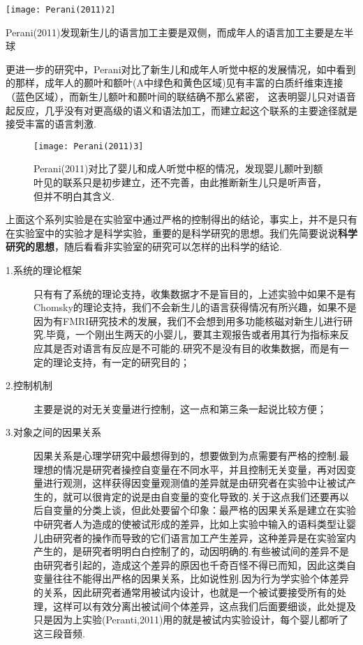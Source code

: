 \begin{marginfigure}
	\texttt{[image: Perani(2011)2]}
	\caption[Perani(2011)2]{Perani(2011)发现新生儿的语言加工主要是双侧，而成年人的语言加工主要是左半球}
\end{marginfigure}

更进一步的研究中，Perani对比了新生儿和成年人听觉中枢的发展情况，如中看到的那样，成年人的颞叶和额叶(A中绿色和黄色区域)见有丰富的白质纤维束连接（蓝色区域），而新生儿额叶和颞叶间的联结确不那么紧密， 这表明婴儿只对语音起反应，几乎没有对更高级的语义和语法加工，而建立起这个联系的主要途径就是接受丰富的语言刺激.

\begin{figure}
	\texttt{[image: Perani(2011)3]}
	\caption[Perani(2011)3]{Perani(2011)对比了婴儿和成人听觉中枢的情况，发现婴儿颞叶到额叶见的联系只是初步建立，还不完善，由此推断新生儿只是听声音，但并不明白其含义.}
\end{figure}

上面这个系列实验是在实验室中通过严格的控制得出的结论，事实上，并不是只有在实验室中的实验才是科学实验，重要的是科学研究的思想。我们先简要说说\textbf{科学研究的思想}，随后看看非实验室的研究可以怎样的出科学的结论.

\begin{description}
    \item[1.系统的理论框架]
    只有有了系统的理论支持，收集数据才不是盲目的，上述实验中如果不是有Chomsky的理论支持，我们不会新生儿的语言获得情况有所兴趣，如果不是因为有FMRI研究技术的发展，我们不会想到用多功能核磁对新生儿进行研究.毕竟，一个刚出生两天的小婴儿，要其主观报告或者用其行为指标来反应其是否对语言有反应是不可能的.研究不是没有目的收集数据，而是有一定的理论支持，有一定的研究目的；
    \item[2.控制机制]
    主要是说的对无关变量进行控制，这一点和第三条一起说比较方便；
    \item[3.对象之间的因果关系]
    因果关系是心理学研究中最想得到的，想要做到为点需要有严格的控制.最理想的情况是研究者操控自变量在不同水平，并且控制无关变量，再对因变量进行观测，这样获得因变量观测值的差异就是由研究者在实验中让被试产生的，就可以很肯定的说是由自变量的变化导致的.关于这点我们还要再以后自变量的分类上谈，但此处要留个印象：最严格的因果关系是建立在实验中研究者人为造成的使被试形成的差异，比如上实验中输入的语料类型让婴儿由研究者的操作而导致的它们语言加工产生差异，这种差异是在实验室内产生的，是研究者明明白白控制了的，动因明确的.有些被试间的差异不是由研究者引起的，造成这个差异的原因也千奇百怪不得已而知，因此这类自变量往往不能得出严格的因果关系，比如说性别.因为行为学实验个体差异的关系，因此研究者通常用被试内设计，也就是一个被试要接受所有的处理，这样可以有效分离出被试间个体差异，这点我们后面要细谈，此处提及只是因为上实验(Peranti,2011)用的就是被试内实验设计，每个婴儿都听了这三段音频.
\end{description}


